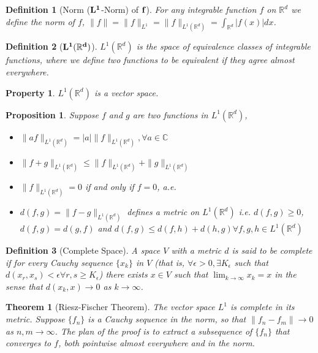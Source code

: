 \documentclass{report}
\theoremstyle{upthm}
\newtheorem{thm}{Theorem}
\newtheorem{defn}{Definition}
\newtheorem{prop}{Proposition}
\newtheorem{property}{Property}
\newcommand{\reals}{\mathbb{R}}
\newcommand{\mb}[1]{{\mathbb{#1}}}
\newcommand{\set}[1]{\big\lbrace #1 \big\rbrace}
\begin{document}
\begin{defn}[Norm ($\bf L^1$-Norm) of $\bf f$]
	For any integrable function $f$ on $\reals^d$ we define the norm of $f$, $\| f \| = \| f \|_{L^1} = \| f \|_{L^1(\reals^d)} = \int_{\reals^d} |f(x)| dx$.
\end{defn}

\begin{defn}[$\bf L^1(\reals^d)$]
	$L^1(\reals^d)$ is the space of equivalence classes of integrable functions, where we define two functions to be equivalent if they agree almost everywhere.
\end{defn}
\begin{property}
	$L^1(\reals^d)$ is a vector space.
\end{property}

\begin{prop}
	Suppose $f$ and $g$ are two functions in $L^1(\reals^d)$,
	\begin{itemize}
		\item $\| a f \|_{L^1(\reals^d)} = |a| \| f \|_{L^1(\reals^d)}, \forall a \in \mb{C} $
		\item $\| f + g \|_{L^1(\reals^d)} \leq \|  f \|_{L^1(\reals^d)} + \|  g \|_{L^1(\reals^d)} $
		\item $\| f \|_{L^1(\reals^d)} = 0 $ if and only if $f = 0$, a.e.
		\item $d(f, g) = \| f - g \|_{L^1(\reals^d)}$ defines a metric on $L^1(\reals^d)$ i.e. $d(f, g) \geq 0$, $d(f, g) = d(g, f)$ and $d(f, g) \leq d(f, h) + d(h, g) \forall f, g, h \in L^1(\reals^d)$
	\end{itemize}
\end{prop}

\begin{defn}[Complete Space]
	A space $V$ with a metric $d$ is said to be complete if for every Cauchy
	sequence $\set{x_k}$ in $V$ (that is, $\forall \epsilon > 0, \exists K_\epsilon$ such that $d(x_r, x_s) < \epsilon \forall r, s \geq K_\epsilon$) there exists $x \in V$ such that $\lim_{k \rightarrow \infty} x_k = x$ in the sense that $d(x_k, x) \rightarrow 0$ as $k \rightarrow \infty$.
\end{defn}

\begin{thm}[Riesz-Fischer Theorem]
	The vector space $L^1$ is complete in its metric. Suppose $\set{f_n}$ is a Cauchy sequence in the norm, so that $\| f_n - f_m \| \rightarrow 0$ as $n, m \rightarrow \infty$. The plan of the proof is to extract a subsequence of $\set{f_n}$ that converges to $f$, both pointwise almost everywhere and in the norm.
\end{thm}
\end{document}
